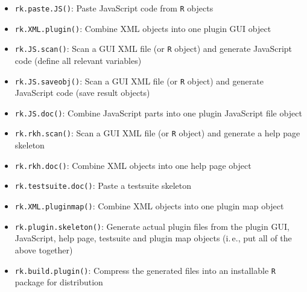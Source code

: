 \documentclass[a4paper,10pt]{scrartcl}
\begin{document}
\begin{itemize}
	\item  \texttt{rk.paste.JS()}: Paste JavaScript code from  \texttt{R} objects
	\item  \texttt{rk.XML.plugin()}: Combine XML objects into one plugin GUI object
	\item  \texttt{rk.JS.scan()}: Scan a GUI XML file (or  \texttt{R} object) and generate JavaScript code
		(define all relevant variables)
	\item  \texttt{rk.JS.saveobj()}: Scan a GUI XML file (or  \texttt{R} object) and generate JavaScript code
		(save result objects)
	\item  \texttt{rk.JS.doc()}: Combine JavaScript parts into one plugin JavaScript file object
	\item  \texttt{rk.rkh.scan()}: Scan a GUI XML file (or  \texttt{R} object) and generate a help page skeleton
	\item  \texttt{rk.rkh.doc()}: Combine XML objects into one help page object
	\item  \texttt{rk.testsuite.doc()}: Paste a testsuite skeleton
	\item  \texttt{rk.XML.pluginmap()}: Combine XML objects into one plugin map object
	\item  \texttt{rk.plugin.skeleton()}: Generate actual plugin files from the plugin GUI, JavaScript, help page,
		testsuite and plugin map objects (i.\,e., put all of the above together)
	\item  \texttt{rk.build.plugin()}: Compress the generated files into an installable  \texttt{R} package for
		distribution
\end{itemize}



%  
%  
\end{document}
